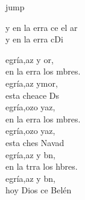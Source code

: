 \begin{cancion}jump\\
	\begin{chorus}%
		y en la erra ce el ar\\
		y en la erra cDi\jump\\
	\end{chorus}%
	egría,az y or, \\
	en la erra los mbres.\\
	egría,az ymor, \\
	esta cheace Ds\\
	\jump
	egría,ozo yaz,\\
	en la erra los mbres.\\
	egría,ozo yaz,\\
	esta ches Navad\\
	\jump
	egría,az y bn, \\
	en la trra los hbres.\\
	egría,az y bn,\\
	hoy Dios ce  Belén\\
	\jump
	\jump
\end{cancion}%
